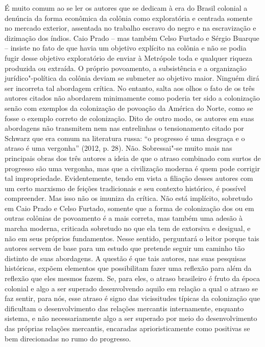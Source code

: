 {É muito comum ao se ler os autores que se dedicam à era do Brasil
colonial a denúncia da forma econômica da colônia como exploratória e
centrada somente no mercado exterior, assentada no trabalho escravo do
negro e na escravização e dizimação dos índios. Caio Prado -- mas também
Celso Furtado e Sérgio Buarque -- insiste no fato de que havia um
objetivo explícito na colônia e não se podia fugir desse objetivo
exploratório de enviar à Metrópole toda e qualquer riqueza produzida ou
extraída. O próprio povoamento, a subsistência e a organização
jurídico"-política da colônia deviam se submeter ao objetivo maior.
Ninguém dirá ser incorreta tal abordagem crítica. No entanto, salta aos
olhos o fato de os três autores citados não abordarem minimamente como
poderia ter sido a colonização senão com exemplos da colonização de
povoação da América do Norte, como se fosse o exemplo correto de
colonização. Dito de outro modo, os autores em suas abordagens não
transmitem nem nas entrelinhas o tensionamento citado por Schwarz que
era comum na literatura russa: ``o progresso é uma desgraça e o atraso é
uma vergonha'' (2012, p. 28). Não. Sobressai"-se muito mais nas
principais obras dos três autores a ideia de que o atraso combinado com
surtos de progresso são uma vergonha, mas que a civilização moderna é
quem pode corrigir tal impropriedade. Evidentemente, tendo em vista a
filiação desses autores com um certo marxismo de feições tradicionais e
seu contexto histórico, é possível compreender. Mas isso não os imuniza
da crítica. Não está implícito, sobretudo em Caio Prado e Celso Furtado,
somente que a forma de colonização dos  ou em outras colônias de
povoamento é a mais correta, mas também uma adesão à marcha moderna,
criticada sobretudo no que ela tem de extorsiva e desigual, e não em
seus próprios fundamentos. Nesse sentido, perguntará o leitor porque
tais autores servem de base para um estudo que pretende seguir um
caminho tão distinto de suas abordagens. A questão é que tais autores,
nas suas pesquisas históricas, expõem elementos que possibilitam fazer
uma reflexão para além da reflexão que eles mesmos fazem. Se, para eles,
o atraso brasileiro é fruto da época colonial e algo a ser superado
desenvolvendo aquilo em relação a qual o atraso se faz sentir, para nós,
esse atraso é signo das vicissitudes típicas da colonização que
dificultam o desenvolvimento das relações mercantis internamente,
enquanto sistema, e não necessariamente algo a ser superado por meio do
desenvolvimento das próprias relações mercantis, encaradas
aprioristicamente como positivas se bem direcionadas no rumo do
progresso.

}
